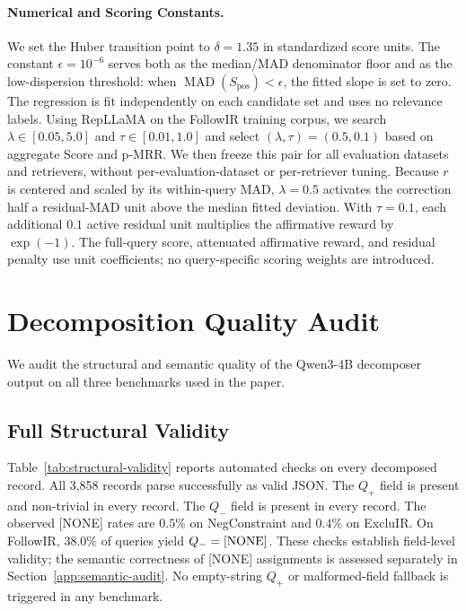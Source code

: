 \documentclass[letterpaper]{article}
\newcommand{\qplus}{Q_{+}}
\newcommand{\qminus}{Q_{-}}
\begin{document}
\paragraph{Numerical and Scoring Constants.}
We set the Huber transition point to $\delta=1.35$ in standardized score units.
The constant $\epsilon=10^{-6}$ serves both as the median/MAD denominator
floor and as the low-dispersion threshold: when
$\operatorname{MAD}(S_{\mathrm{pos}})<\epsilon$, the fitted slope is set to
zero.  The regression is fit independently on each candidate set and uses no
relevance labels.  Using RepLLaMA on the FollowIR training corpus, we search
$\lambda\in[0.05,5.0]$ and $\tau\in[0.01,1.0]$ and select
$(\lambda,\tau)=(0.5,0.1)$ based on aggregate Score and p-MRR.  We then freeze
this pair for all evaluation datasets and retrievers, without
per-evaluation-dataset or per-retriever tuning.  Because
$r$ is centered and scaled by its within-query MAD, $\lambda=0.5$ activates
the correction half a residual-MAD unit above the median fitted deviation.
With $\tau=0.1$, each additional $0.1$ active residual unit multiplies the
affirmative reward by $\exp(-1)$.  The full-query score, attenuated affirmative
reward, and residual penalty use unit coefficients; no query-specific scoring
weights are introduced.

\section{Decomposition Quality Audit}
\label{app:decomposition-audit}

We audit the structural and semantic quality of the Qwen3-4B decomposer
output on all three benchmarks used in the paper.

\subsection{Full Structural Validity}
\label{app:structural-validity}

Table~\ref{tab:structural-validity} reports automated checks on every
decomposed record.  All 3{,}858 records parse successfully as valid JSON.
The $\qplus$ field is present and non-trivial in every record.
The $\qminus$ field is present in every record.  The observed [NONE] rates
are $0.5\%$ on NegConstraint and $0.4\%$ on ExcluIR.  On FollowIR,
$38.0\%$ of queries yield $\qminus=\textnormal{[NONE]}$.  These checks establish
field-level validity; the semantic correctness of [NONE] assignments is
assessed separately in Section~\ref{app:semantic-audit}.  No empty-string
$\qplus$ or malformed-field fallback is triggered in any benchmark.
\end{document}
